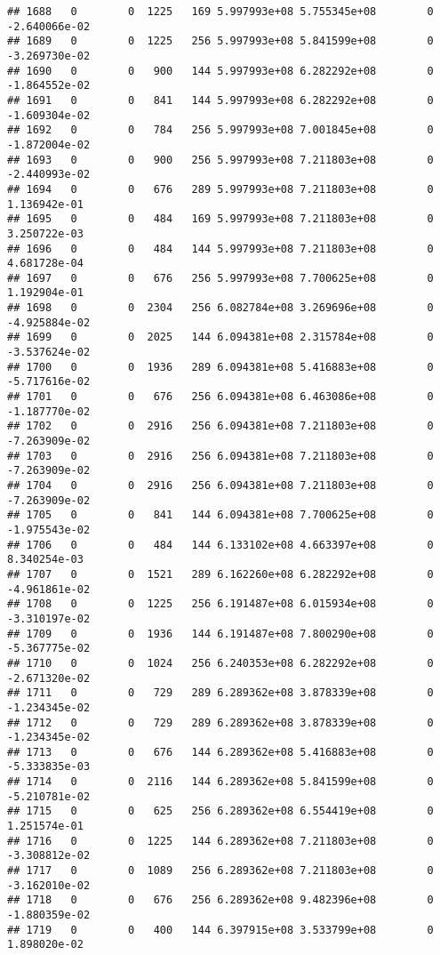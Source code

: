 \documentclass[
]{article}
\begin{document}
\begin{enumerate}
\begin{verbatim}
## 1688   0        0  1225   169 5.997993e+08 5.755345e+08        0 -2.640066e-02
## 1689   0        0  1225   256 5.997993e+08 5.841599e+08        0 -3.269730e-02
## 1690   0        0   900   144 5.997993e+08 6.282292e+08        0 -1.864552e-02
## 1691   0        0   841   144 5.997993e+08 6.282292e+08        0 -1.609304e-02
## 1692   0        0   784   256 5.997993e+08 7.001845e+08        0 -1.872004e-02
## 1693   0        0   900   256 5.997993e+08 7.211803e+08        0 -2.440993e-02
## 1694   0        0   676   289 5.997993e+08 7.211803e+08        0  1.136942e-01
## 1695   0        0   484   169 5.997993e+08 7.211803e+08        0  3.250722e-03
## 1696   0        0   484   144 5.997993e+08 7.211803e+08        0  4.681728e-04
## 1697   0        0   676   256 5.997993e+08 7.700625e+08        0  1.192904e-01
## 1698   0        0  2304   256 6.082784e+08 3.269696e+08        0 -4.925884e-02
## 1699   0        0  2025   144 6.094381e+08 2.315784e+08        0 -3.537624e-02
## 1700   0        0  1936   289 6.094381e+08 5.416883e+08        0 -5.717616e-02
## 1701   0        0   676   256 6.094381e+08 6.463086e+08        0 -1.187770e-02
## 1702   0        0  2916   256 6.094381e+08 7.211803e+08        0 -7.263909e-02
## 1703   0        0  2916   256 6.094381e+08 7.211803e+08        0 -7.263909e-02
## 1704   0        0  2916   256 6.094381e+08 7.211803e+08        0 -7.263909e-02
## 1705   0        0   841   144 6.094381e+08 7.700625e+08        0 -1.975543e-02
## 1706   0        0   484   144 6.133102e+08 4.663397e+08        0  8.340254e-03
## 1707   0        0  1521   289 6.162260e+08 6.282292e+08        0 -4.961861e-02
## 1708   0        0  1225   256 6.191487e+08 6.015934e+08        0 -3.310197e-02
## 1709   0        0  1936   144 6.191487e+08 7.800290e+08        0 -5.367775e-02
## 1710   0        0  1024   256 6.240353e+08 6.282292e+08        0 -2.671320e-02
## 1711   0        0   729   289 6.289362e+08 3.878339e+08        0 -1.234345e-02
## 1712   0        0   729   289 6.289362e+08 3.878339e+08        0 -1.234345e-02
## 1713   0        0   676   144 6.289362e+08 5.416883e+08        0 -5.333835e-03
## 1714   0        0  2116   144 6.289362e+08 5.841599e+08        0 -5.210781e-02
## 1715   0        0   625   256 6.289362e+08 6.554419e+08        0  1.251574e-01
## 1716   0        0  1225   144 6.289362e+08 7.211803e+08        0 -3.308812e-02
## 1717   0        0  1089   256 6.289362e+08 7.211803e+08        0 -3.162010e-02
## 1718   0        0   676   256 6.289362e+08 9.482396e+08        0 -1.880359e-02
## 1719   0        0   400   144 6.397915e+08 3.533799e+08        0  1.898020e-02

\end{verbatim}
\end{enumerate}
\end{document}
